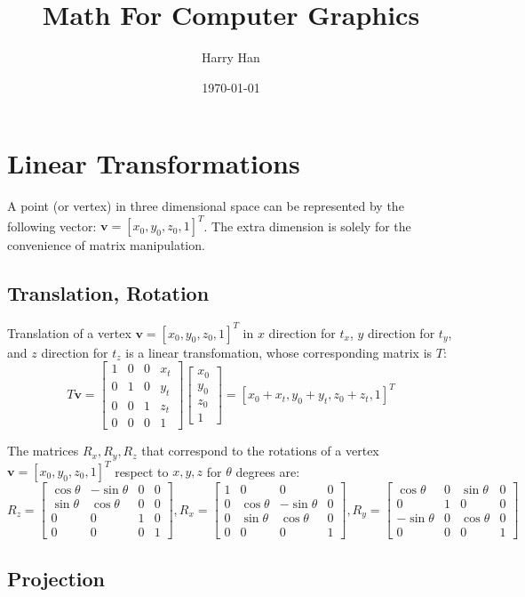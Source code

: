 \documentclass[12pt, a4paper]{article}
\title{Math For Computer Graphics}
\author{Harry Han}
\date{\today}
\theoremstyle{definition}
\theoremstyle{remark}
\begin{document}
\maketitle
\section{Linear Transformations}

A point (or vertex) in three dimensional space can be represented by the following vector: $\bm{v}=[x_0, y_0 ,z_0, 1]^{T}$. The extra dimension is solely for the convenience of matrix manipulation.

\subsection{Translation, Rotation}

Translation of a vertex $\bm{v}=[x_0, y_0,z_0, 1]^T$ in $x$ direction for $t_x$, $y$ direction for $t_y$, and $z$ direction for $t_z$ is a linear transfomation, whose corresponding matrix is $T$:
\begin{equation}\label{eq:translation}
	T\bm{v} = 
	\begin{bmatrix}
	1 & 0 & 0 & x_t\\
	0 & 1 & 0 & y_t\\
	0 & 0 & 1 & z_t\\
	0 & 0 & 0 & 1
	\end{bmatrix} 
	\begin{bmatrix}
	x_0\\
	y_0\\
	z_0\\
	1
	\end{bmatrix}
	= [x_0 + x_t, y_0 + y_t, z_0 + z_t, 1]^T
\end{equation}

The matrices $R_x, R_y, R_z$ that correspond to the rotations of a vertex $\bm{v}=[x_0, y_0, z_0, 1]^T$ respect to $x, y, z$ for $\theta$ degrees are:
\begingroup
\fontsize{10}{12}\selectfont
\begin{equation}\label{eq:rotation}
	R_z = 
	\begin{bmatrix}
	\cos{\theta} & -\sin{\theta} & 0 & 0\\
	\sin{\theta} & \cos{\theta} & 0 & 0\\
	0 & 0 & 1 & 0\\
	0 & 0 & 0 & 1
	\end{bmatrix}, 
	R_x =
	\begin{bmatrix}
	1 & 0 & 0 & 0\\
	0 & \cos{\theta} & -\sin{\theta} & 0\\
	0 & \sin{\theta} & \cos{\theta} & 0\\
	0 & 0 & 0 & 1
	\end{bmatrix}, 
	R_y =
	\begin{bmatrix}
	\cos{\theta} & 0 & \sin{\theta} & 0\\
	0 & 1 & 0 & 0\\
	-\sin{\theta} & 0 & \cos{\theta} & 0\\
	0 & 0 & 0 & 1
	\end{bmatrix}
\end{equation}
\endgroup



\subsection{Projection}
\end{document}
